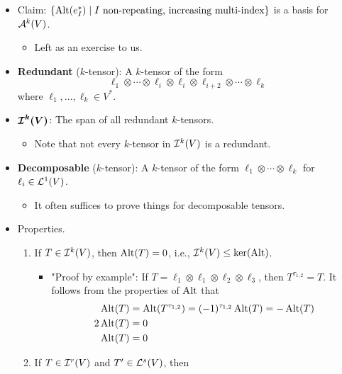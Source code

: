 \documentclass[../notes.tex]{subfiles}
\begin{document}
\begin{itemize}
\begin{itemize}
    \end{itemize}
    \item Claim: $\{\Alt(e_I^*)\mid I\text{ non-repeating, increasing multi-index}\}$ is a basis for $\alt[k]{V}$.
    \begin{itemize}
        \item Left as an exercise to us.
    \end{itemize}
    \item \textbf{Redundant} ($k$-tensor): A $k$-tensor of the form
    \begin{equation*}
        \ell_1\otimes\cdots\otimes\ell_i\otimes\ell_i\otimes\ell_{i+2}\otimes\cdots\otimes\ell_k
    \end{equation*}
    where $\ell_1,\dots,\ell_k\in V^*$.
    \item $\bm{\ide[k]{V}}$: The span of all redundant $k$-tensors.
    \begin{itemize}
        \item Note that not every $k$-tensor in $\ide[k]{V}$ is a redundant.
    \end{itemize}
    \item \textbf{Decomposable} ($k$-tensor): A $k$-tensor of the form $\ell_1\otimes\cdots\otimes\ell_k$ for $\ell_i\in\lin[1]{V}$.
    \begin{itemize}
        \item It often suffices to prove things for decomposable tensors.
    \end{itemize}
    \item Properties.
    \begin{enumerate}
        \item If $T\in\ide[k]{V}$, then $\Alt(T)=0$, i.e., $\ide[k]{V}\leq\ker(\Alt)$.
        \begin{itemize}
            \item "Proof by example": If $T=\ell_1\otimes\ell_1\otimes\ell_2\otimes\ell_3$, then $T^{\tau_{1,2}}=T$. It follows from the properties of $\Alt$ that
            \begin{align*}
                \Alt(T) &= \Alt(T^{\tau_{1,2}})
                = (-1)^{\tau_{1,2}}\Alt(T)
                = -\Alt(T)\\
                2\Alt(T) &= 0\\
                \Alt(T) &= 0
            \end{align*}
        \end{itemize}
        \item If $T\in\ide[r]{V}$ and $T'\in\lin[s]{V}$, then

\end{enumerate}
\end{itemize}
\end{document}
